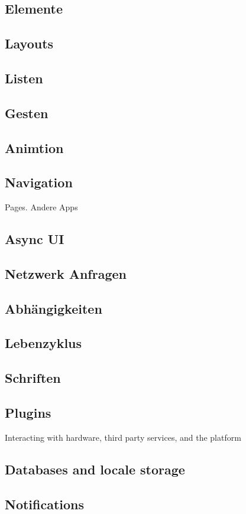 \subsection{Elemente}
\subsection{Layouts}
\subsection{Listen}
\subsection{Gesten}
\subsection{Animtion}

\subsection{Navigation}
Pages.
Andere Apps
\subsection{Async UI}
\subsection{Netzwerk Anfragen}
\subsection{Abhängigkeiten}
\subsection{Lebenzyklus}
\subsection{Schriften}
\subsection{Plugins}
Interacting with hardware, third party services, and the platform
\subsection{Databases and locale storage}
\subsection{Notifications}


